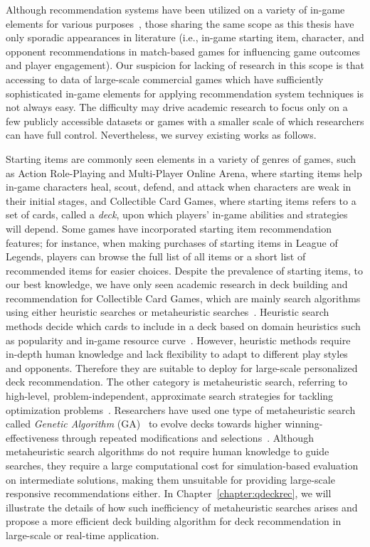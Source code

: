 Although recommendation systems have been utilized on a variety of in-game elements for various purposes~\cite{kolen2018horizontal,wu2017recommendation}, those sharing the same scope as this thesis have only sporadic appearances in literature (i.e., in-game starting item, character, and opponent recommendations in match-based games for influencing game outcomes and player engagement). 
Our suspicion for lacking of research in this scope is that accessing to data of large-scale commercial games which have sufficiently sophisticated in-game elements for applying recommendation system techniques is not always easy. The difficulty may drive academic research to focus only on a few publicly accessible datasets or games with a smaller scale of which researchers can have full control. Nevertheless, we survey existing works as follows.

Starting items are commonly seen elements in a variety of genres of games, such as Action Role-Playing and Multi-Player Online Arena, where starting items help in-game characters heal, scout, defend, and attack when characters are weak in their initial stages, and Collectible Card Games, where starting items refers to a set of cards, called a \textit{deck}, upon which players' in-game abilities and strategies will depend. Some games have incorporated starting item recommendation features; for instance, when making purchases of starting items in League of Legends, players can browse the full list of all items or a short list of recommended items for easier choices. Despite the prevalence of starting items, to our best knowledge, we have only seen academic research in deck building and recommendation for Collectible Card Games, which are mainly search algorithms using either heuristic searches or metaheuristic searches~\cite{birattari2009tuning}. Heuristic search methods decide which cards to include in a deck based on domain heuristics such as popularity and in-game resource curve~\cite{frankkarsten,willfancher,stiegler2016hearthstone}. However, heuristic methods require in-depth human knowledge and lack flexibility to adapt to different play styles and opponents. Therefore they are suitable to deploy for large-scale personalized deck recommendation. The other category is metaheuristic search, referring to high-level, problem-independent, approximate search strategies for tackling optimization problems~\cite{birattari2009tuning}. Researchers have used one type of metaheuristic search called \textit{Genetic Algorithm} (GA)~\cite{holland1992adaptation} to evolve decks towards higher winning-effectiveness through repeated modifications and selections~\cite{garcia2016evolutionary,bjorke2017deckbuilding}. Although metaheuristic search algorithms do not require human knowledge to guide searches, they require a large computational cost for simulation-based evaluation on intermediate solutions, making them unsuitable for providing large-scale responsive recommendations either. In Chapter~\ref{chapter:qdeckrec}, we will illustrate the details of how such inefficiency of metaheuristic searches arises and propose a more efficient deck building algorithm for deck recommendation in large-scale or real-time application. 


